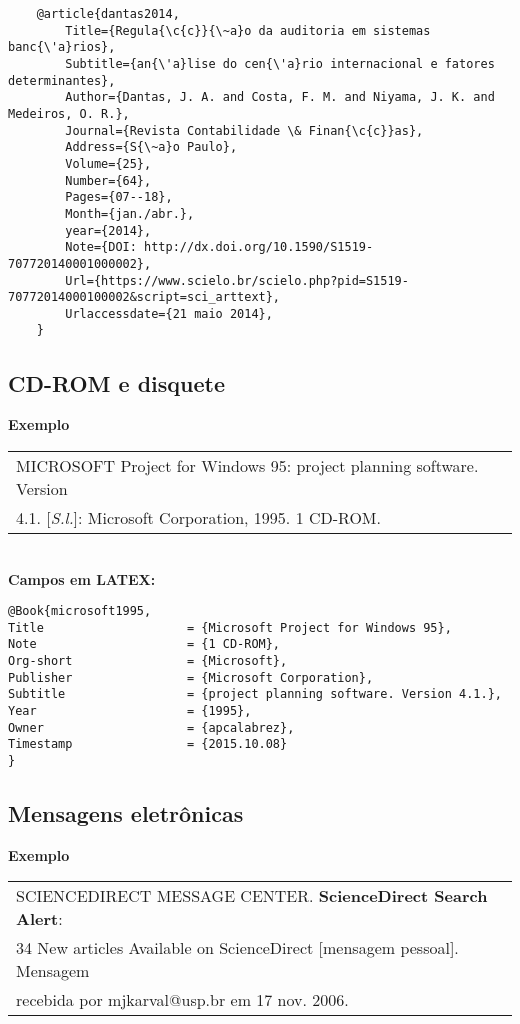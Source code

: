 \begin{verbatim}
	@article{dantas2014,
		Title={Regula{\c{c}}{\~a}o da auditoria em sistemas banc{\'a}rios},
		Subtitle={an{\'a}lise do cen{\'a}rio internacional e fatores determinantes},
		Author={Dantas, J. A. and Costa, F. M. and Niyama, J. K. and Medeiros, O. R.},
		Journal={Revista Contabilidade \& Finan{\c{c}}as},
		Address={S{\~a}o Paulo},
		Volume={25},
		Number={64},
		Pages={07--18},
		Month={jan./abr.},
		year={2014},
		Note={DOI: http://dx.doi.org/10.1590/S1519-707720140001000002},
		Url={https://www.scielo.br/scielo.php?pid=S1519-70772014000100002&script=sci_arttext},
		Urlaccessdate={21 maio 2014},	
	}
\end{verbatim}


\subsection{CD-ROM e disquete}

\textbf{Exemplo} \\

\begin{tabular}{|l|c|} \hline
	MICROSOFT Project for Windows 95: project planning software. Version \\4.1. [\textit{S.l.}]: Microsoft Corporation, 1995. 1 CD-ROM. 
	\\\hline
\end{tabular} \\

\textbf{Campos em LATEX:} 

\begin{verbatim}
@Book{microsoft1995,
Title                    = {Microsoft Project for Windows 95},
Note                     = {1 CD-ROM},
Org-short                = {Microsoft},
Publisher                = {Microsoft Corporation},
Subtitle                 = {project planning software. Version 4.1.},
Year                     = {1995},
Owner                    = {apcalabrez},
Timestamp                = {2015.10.08}
}
\end{verbatim}

\subsection{Mensagens eletrônicas}

\textbf{Exemplo} \\

\begin{tabular}{|l|c|} \hline
	SCIENCEDIRECT MESSAGE CENTER. \textbf{ScienceDirect Search Alert}: \\34 New articles Available on ScienceDirect [mensagem pessoal]. Mensagem \\recebida por mjkarval@usp.br em 17 nov. 2006. 
	\\\hline
\end{tabular} \\

